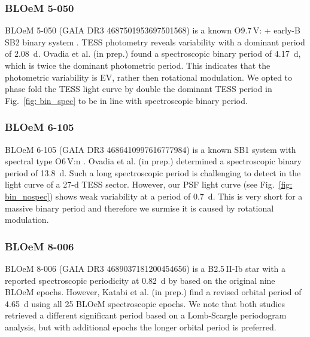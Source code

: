 \documentclass[fleqn,usenatbib]{mnras}
\begin{document}
\subsubsection{BLOeM 5-050}
BLOeM 5-050 (GAIA DR3 4687501953697501568) is a known O9.7\,V: + early-B SB2 binary system \citep{BLOeM2024,Bestenlehner+2025,Sana+2025NatAs}. TESS photometry reveals variability with a dominant period of $2.08$~d. {\color{blue}Ovadia et al.} (in prep.) found a spectroscopic binary period of 4.17~d, which is twice the dominant photometric period. This indicates that the photometric variability is EV, rather then rotational modulation. We opted to phase fold the TESS light curve by double the dominant TESS period in Fig.~\ref{fig: bin_spec} to be in line with spectroscopic binary period.

\subsubsection{BLOeM 6-105}
BLOeM 6-105 (GAIA DR3 4686410997616777984) is a known SB1 system with spectral type O6\,V:n  \citep{BLOeM2024, Bestenlehner+2025, Sana+2025NatAs}. {\color{blue}Ovadia et al.} (in prep.) determined a spectroscopic binary period of 13.8~d. Such a long spectroscopic period is challenging to detect in the light curve of a 27-d TESS sector. However, our PSF light curve (see Fig.~\ref{fig: bin_nospec}) shows weak variability at a period of $0.7$~d. This is very short for a massive binary period and therefore we surmise it is caused by rotational modulation. 

\subsubsection{BLOeM 8-006}
BLOeM 8-006 (GAIA DR3 4689037181200454656) is a B2.5\,II-Ib star \citep{BLOeM2024,Bestenlehner+2025} with a reported spectroscopic periodicity at 0.82~d by \citet{Britavskiy+2025} based on the original nine BLOeM epochs. However, {\color{blue}Katabi et al.} (in prep.) find a revised orbital period of 4.65~d using all 25 BLOeM spectroscopic epochs. We note that both studies retrieved a different significant period based on a Lomb-Scargle periodogram analysis, but with additional epochs the longer orbital period is preferred. 
\end{document}

